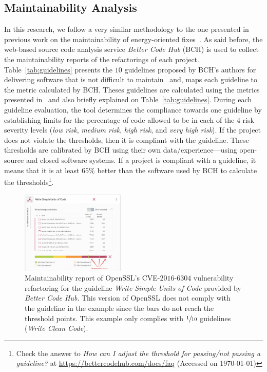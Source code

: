 \documentclass[smallextended]{svjour3}       %
\begin{document}
\subsection{Maintainability Analysis}

In this research, we follow a very similar methodology to the one presented 
in previous work on the maintainability of energy-oriented fixes~\cite{8919169}. 
As said before, the web-based source code analysis service \emph{Better Code
Hub} (BCH) is used to collect the maintainability reports of the refactorings of
each project. Table~\ref{tab:guidelines} presents the $10$ guidelines proposed
by BCH's authors for delivering software that is not difficult to
maintain~\cite{Visser:2016:OREILLY} and, maps each guideline to the metric 
calculated by BCH. Theses guidelines are calculated using the metrics 
presented in~\cite{criteria:2017} and also briefly explained on Table~\ref{tab:guidelines}. 
During each guideline evaluation, the tool determines the compliance towards 
one guideline by establishing limits for the percentage of code allowed to be 
in each of the $4$ risk severity levels
(\emph{low risk}, \emph{medium risk}, \emph{high risk}, and \emph{very high
risk}). If the project does not violate the thresholds, then it is compliant
with the guideline. These thresholds are calibrated by BCH using their own
data/experience---using open-source and closed software systems. If a project is
compliant with a guideline, it means that it is at least $65\%$ better than the
software used by BCH to calculate the thresholds\footnote{Check the answer to
\emph{How can I adjust the threshold for passing/not passing a guideline?} at
\url{https://bettercodehub.com/docs/faq} (Accessed on \today{})}.

\begin{figure}[h]
 	\centering 	
	\includegraphics[width=0.44\textwidth]{figures/bch_report.png}
 	\caption{Maintainability report of OpenSSL's CVE-$2016$-$6304$ vulnerability
refactoring for the guideline \emph{Write Simple Units of Code} provided by
\emph{Better Code Hub}. This version of OpenSSL does not comply with the
guideline in the example since the bars do not reach the threshold points. This
example only complies with $\sfrac{1}{10}$ guidelines (\emph{Write Clean Code}).}
	\label{fig:bchrep}
\end{figure}
\end{document}
